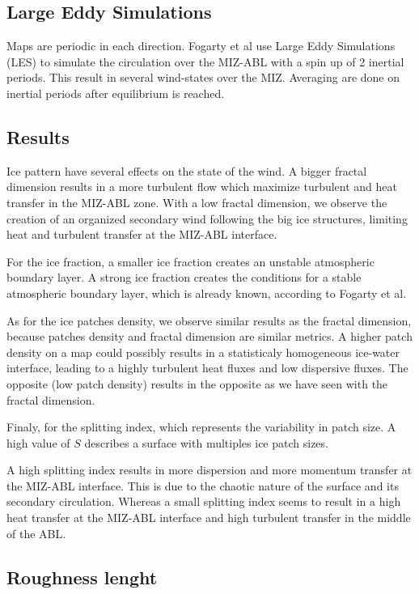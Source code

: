 \documentclass[10pt]{article}
\numberwithin{equation}{section}
\begin{document}
\subsection{Large Eddy Simulations}
\label{sec:orga66de50}

Maps are periodic in each direction. Fogarty et al use Large Eddy Simulations (LES) to simulate the circulation over the MIZ-ABL with a spin up of 2 inertial periods. This result in several wind-states over the MIZ. Averaging are done on inertial periods after equilibrium is reached.
\subsection{Results}
\label{sec:org7479e4c}

Ice pattern have several effects on the state of the wind. A bigger fractal dimension results in a more turbulent flow which maximize turbulent and heat transfer in the MIZ-ABL zone. With a low fractal dimension, we observe the creation of an organized secondary wind following the big ice structures, limiting heat and turbulent transfer at the MIZ-ABL interface.\bigskip

For the ice fraction, a smaller ice fraction creates an unstable atmospheric boundary layer.
A strong ice fraction creates the conditions for a stable atmospheric boundary layer, which is already known, according to Fogarty et al.\bigskip

As for the ice patches density, we observe similar results as the fractal dimension, because patches density and fractal dimension are similar metrics. A higher patch density on a map could possibly results in a statisticaly homogeneous ice-water interface, leading to a highly turbulent heat fluxes and low dispersive fluxes. The opposite (low patch density) results in the opposite as we have seen with the fractal dimension.\bigskip

Finaly, for the splitting index, which represents the variability in patch size. A high value of \(S\) describes a surface with multiples ice patch sizes. \bigskip

A high splitting index results in more dispersion and more momentum transfer at the MIZ-ABL interface. This is due to the chaotic nature of the surface and its secondary circulation. Whereas a small splitting index seems to result in a high heat transfer at the MIZ-ABL interface and high turbulent transfer in the middle of the ABL.
\subsection{Roughness lenght}
\label{sec:org9218520}
\end{document}
